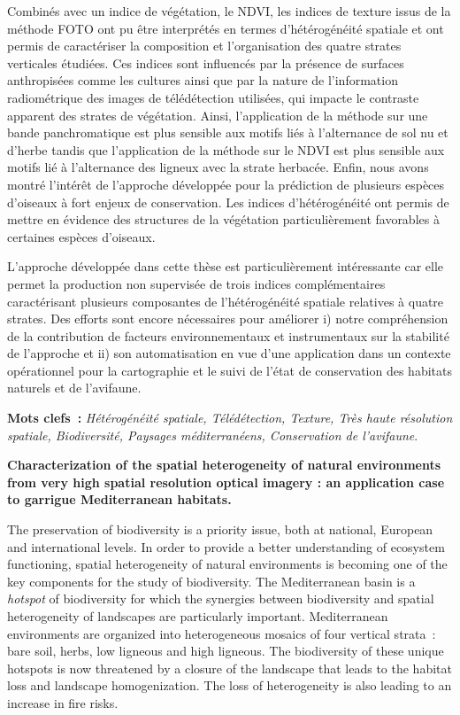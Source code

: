 Combinés avec un indice de végétation, le NDVI, les indices de texture issus de la méthode FOTO ont pu être interprétés en termes d'hétérogénéité spatiale et ont permis de caractériser la composition et l'organisation des quatre strates verticales étudiées. Ces indices sont influencés par la présence de surfaces anthropisées comme les cultures ainsi que par la nature de l'information radiométrique des images de télédétection utilisées, qui impacte le contraste apparent des strates de végétation. Ainsi, l'application de la méthode sur une bande panchromatique est plus sensible aux motifs liés à l'alternance de sol nu et d'herbe tandis que l'application de la méthode sur le NDVI est plus sensible aux motifs lié à l'alternance des ligneux avec la strate herbacée. Enfin, nous avons montré l’intérêt de l’approche développée pour la prédiction de plusieurs espèces d’oiseaux à fort enjeux de conservation. Les indices d’hétérogénéité ont permis de mettre en évidence des structures de la végétation particulièrement favorables à certaines espèces d’oiseaux.

L'approche développée dans cette thèse est particulièrement intéressante car elle permet la production non supervisée de trois indices complémentaires caractérisant plusieurs composantes de l'hétérogénéité spatiale relatives à quatre strates. Des efforts sont encore nécessaires pour améliorer i) notre compréhension de la contribution de facteurs environnementaux et instrumentaux sur la stabilité de l'approche et ii) son automatisation en vue d'une application dans un contexte opérationnel pour la cartographie et le suivi de l'état de conservation des habitats naturels et de l'avifaune.

\textbf{Mots clefs~:}{ \it Hétérogénéité spatiale, Télédétection, Texture, Très haute résolution spatiale, Biodiversité, Paysages méditerranéens, Conservation de l’avifaune}.
\vskip 0.5cm
\noindent

\textbf{Characterization of the spatial heterogeneity of natural environments from very high spatial resolution optical imagery : an application case to garrigue Mediterranean habitats.}

The preservation of biodiversity is a priority issue, both at national, European and international levels. In order to provide a better understanding of ecosystem functioning, spatial heterogeneity of natural environments is becoming one of the key components for the study of biodiversity. The Mediterranean basin is a \emph{hotspot} of biodiversity for which the synergies between biodiversity and spatial heterogeneity of landscapes are particularly important. Mediterranean environments are organized into heterogeneous mosaics of four vertical strata~: bare soil, herbs, low ligneous and high ligneous. The biodiversity of these unique hotspots is now threatened by a closure of the landscape that leads to the habitat loss and landscape homogenization. The loss of heterogeneity is also leading to an increase in fire risks.

